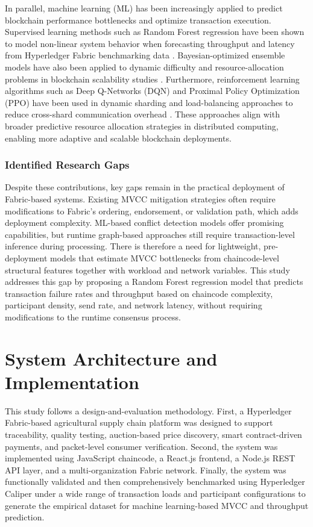 ﻿\documentclass[12pt]{article}
\begin{document}
In parallel, machine learning (ML) has been increasingly applied to predict blockchain performance bottlenecks and optimize transaction execution. Supervised learning methods such as Random Forest regression have been shown to model non-linear system behavior when forecasting throughput and latency from Hyperledger Fabric benchmarking data \cite{Deshinta_Predicting_2025}. Bayesian-optimized ensemble models have also been applied to dynamic difficulty and resource-allocation problems in blockchain scalability studies \cite{Manjula_Scalability_2025}. Furthermore, reinforcement learning algorithms such as Deep Q-Networks (DQN) and Proximal Policy Optimization (PPO) have been used in dynamic sharding and load-balancing approaches to reduce cross-shard communication overhead \cite{Mutum_Dynamic_2025}. These approaches align with broader predictive resource allocation strategies in distributed computing, enabling more adaptive and scalable blockchain deployments.

\subsubsection{Identified Research Gaps}

Despite these contributions, key gaps remain in the practical deployment of Fabric-based systems. Existing MVCC mitigation strategies often require modifications to Fabric's ordering, endorsement, or validation path, which adds deployment complexity. ML-based conflict detection models offer promising capabilities, but runtime graph-based approaches still require transaction-level inference during processing. There is therefore a need for lightweight, pre-deployment models that estimate MVCC bottlenecks from chaincode-level structural features together with workload and network variables. This study addresses this gap by proposing a Random Forest regression model that predicts transaction failure rates and throughput based on chaincode complexity, participant density, send rate, and network latency, without requiring modifications to the runtime consensus process.
\section{System Architecture and Implementation}
	
	This study follows a design-and-evaluation methodology. First, a Hyperledger Fabric-based agricultural supply chain platform was designed to support traceability, quality testing, auction-based price discovery, smart contract-driven payments, and packet-level consumer verification. Second, the system was implemented using JavaScript chaincode, a React.js frontend, a Node.js REST API layer, and a multi-organization Fabric network. Finally, the system was functionally validated and then comprehensively benchmarked using Hyperledger Caliper under a wide range of transaction loads and participant configurations to generate the empirical dataset for machine learning-based MVCC and throughput prediction.
	
\end{document}
